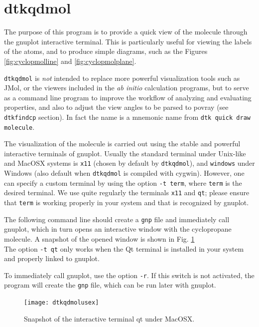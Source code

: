 \section{\label{sec:dtkqdmol}dtkqdmol}

The purpose of this program is to provide a quick view of the molecule through the gnuplot interactive terminal. This is particularly useful for viewing the labels of the atoms, and to produce simple diagrams, such as the Figures \ref{fig:cyclopmolline} and \ref{fig:cyclopmolplane}.

\texttt{dtkqdmol} is \textit{not} intended to replace more powerful visualization tools such as JMol, or the viewers included in the \textit{ab initio} calculation programs, but to serve as a command line program to improve the workflow of analyzing and evaluating properties, and also to adjust the view angles to be parsed to povray (see \texttt{dtkfindcp} section). In fact the name is a mnemonic name from \texttt{dtk quick draw molecule}.

The visualization of the molecule is carried out using the stable and powerful interactive terminals of gnuplot. Usually the standard terminal under Unix-like and MacOSX systems is \texttt{x11} (chosen by default by \texttt{dtkqdmol}), and \texttt{windows} under Windows (also default when \texttt{dtkqdmol} is compiled with cygwin). However, one can specify a custom terminal by using the option \texttt{-t term}, where \texttt{term} is the desired terminal. We use quite regularly the terminals \texttt{x11} and \texttt{qt}; please ensure that \texttt{term} is working properly in your system and that is recognized by gnuplot.

The following command line should create a \texttt{gnp} file and immediately call gnuplot, which in turn opens an interactive window with the cyclopropane molecule. A snapshot of the opened window is shown in Fig. \ref{fig:dtkqdmolusex}\\
The option \texttt{-t qt} only works when the Qt terminal is installed in your system and properly linked to gnuplot.

To immediately call gnuplot, use the option \texttt{-r}. If this switch is not activated, the program will create the \texttt{gnp} file, which can be run later with gnuplot.
%
\begin{figure}[hb!]
\centering
\texttt{[image: dtkqdmolusex]}
\caption{Snapshot of the interactive terminal qt under MacOSX.}\label{fig:dtkqdmolusex}
\end{figure}
%

